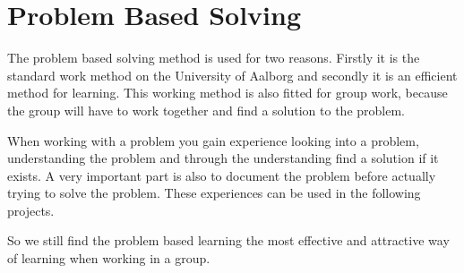 \section{Problem Based Solving}
The problem based solving method is used for two reasons. Firstly it is the standard work method on the University of Aalborg and secondly it is an efficient method for learning.
This working method is also fitted for group work, because the group will have to work together and find a solution to the problem.

When working with a problem you gain experience looking into a problem, understanding the problem and through the understanding find a solution if it exists. A very important part is also to document the problem before actually trying to solve the problem.
These experiences can be used in the following projects.

So we still find the problem based learning the most effective and attractive way of learning when working in a group.